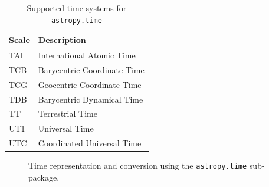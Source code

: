 \documentclass[traditabstract]{aa}
\begin{document}
\begin{table}
\caption{Supported time systems for \texttt{astropy.time}\label{tab:time_systems}}
\center
\begin{tabular}{ll}
\hline
Scale  & Description \\
\hline
TAI    & International Atomic Time \\
TCB    & Barycentric Coordinate Time \\
TCG    & Geocentric Coordinate Time \\
TDB    & Barycentric Dynamical Time \\
TT     & Terrestrial Time \\
UT1    & Universal Time \\
UTC    & Coordinated Universal Time \\
\hline
\end{tabular}
\end{table}



\begin{figure}
\center
\caption{Time representation and conversion using the \texttt{astropy.time} sub-package.\label{code:time}}
\vspace{0.1in}
\end{figure}
\end{document}
